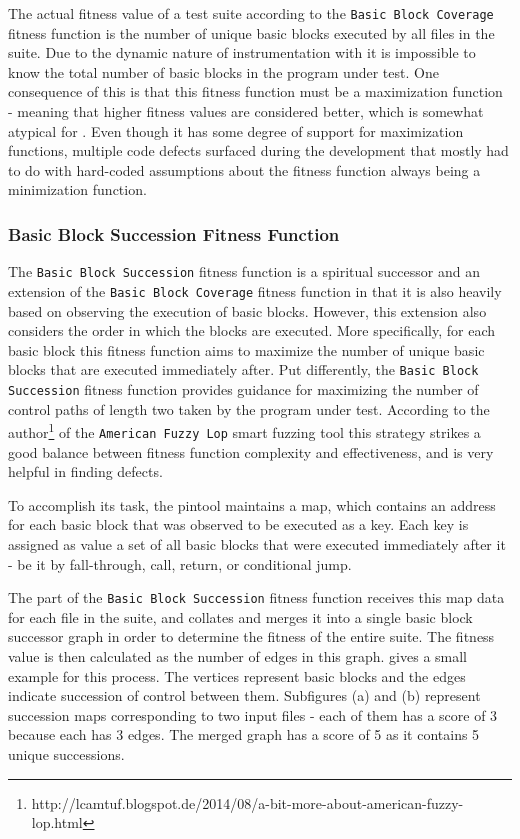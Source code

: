 The actual fitness value of a test suite according to the \texttt{Basic Block Coverage} fitness function 
is the number of unique basic blocks executed by all \xml files in the suite. Due to the dynamic nature 
of instrumentation with \pin it is impossible to know the total number of basic blocks in the program 
under test. One consequence of this is that this fitness function must be a maximization function - meaning
that higher fitness values are considered better, which is somewhat atypical for \evosuite. Even though it has
some degree of support for maximization functions, multiple code defects surfaced during the development that
mostly had to do with hard-coded assumptions about the fitness function always being a minimization function.

\subsubsection{Basic Block Succession Fitness Function}
The \texttt{Basic Block Succession} fitness function is a spiritual successor and an extension of the
\texttt{Basic Block Coverage} fitness function in that it is also heavily based on observing the execution of
basic blocks. However, this extension also considers the order in which the blocks are executed. More
specifically, for each basic block this fitness function aims to maximize the number of unique basic blocks
that are executed immediately after.
Put differently, the \texttt{Basic Block Succession} fitness function provides guidance for maximizing the
number of control paths of length two taken by the program under test. According to the
author\footnote{http://lcamtuf.blogspot.de/2014/08/a-bit-more-about-american-fuzzy-lop.html} of the
\texttt{American Fuzzy Lop} smart fuzzing tool\cite{afl} this strategy strikes a good balance between
fitness function complexity and effectiveness, and is very helpful in finding defects.

To accomplish its task, the pintool maintains a map, which contains an address for each basic block that was
observed to be executed as a key. Each key is assigned as value a set of all basic blocks that were executed
immediately after it - be it by fall-through, call, return, or conditional jump. 

The \java part of the \texttt{Basic Block Succession} fitness function receives this map data for each file in
the suite, and collates and merges it into a single basic block successor graph in order to determine the
fitness of the entire suite. The fitness value is then calculated as the number of edges in this graph. 
 gives a small example for this process. The vertices represent basic blocks and the edges
indicate succession of control between them. Subfigures (a) and (b) represent succession maps corresponding to
two input files - each of them has a score of 3 because each has 3 edges. The merged graph has a score of 5 as
it contains 5 unique successions.


